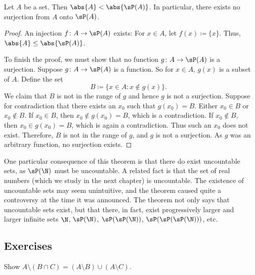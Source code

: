 \begin{thm}
\label{cantorspowersetthm}
Let $A$ be a set.  Then
$\abs{A} < \abs{\sP(A)}$.
In particular, there exists no surjection from
$A$ onto $\sP(A)$.
\end{thm}

\begin{proof}
An injection $f \colon A \to \sP(A)$ exists:
For $x \in A$, let $f(x) \coloneqq \{ x \}$.  Thus,
$\abs{A} \leq \abs{\sP(A)}$.

To finish the proof, we must show that
no function $g \colon A \to \sP(A)$ is a surjection.
Suppose 
$g \colon A \to \sP(A)$ is a function.  So for $x \in A$,
$g(x)$ is a subset of $A$.  Define the set
\begin{equation*}
B \coloneqq \bigl\{ x \in A : x \notin g(x) \bigr\} .
\end{equation*}
We claim that $B$ is not in the range of $g$ and hence $g$ is not a
surjection.  Suppose for contradiction that there exists an $x_0$ such that $g(x_0) = B$.
Either $x_0 \in B$ or $x_0 \notin B$.  If $x_0 \in B$, then $x_0 \notin
g(x_0) = B$, which is a contradiction.  If $x_0 \notin B$, then $x_0 \in
g(x_0) = B$, which is again a contradiction.  Thus such an $x_0$ does not
exist.  Therefore, $B$ is not in the range of $g$, and $g$ is not a
surjection.  As $g$ was an arbitrary function, no surjection exists.
\end{proof}

One particular consequence of this 
theorem is that there do exist uncountable sets,
as $\sP(\N)$ must be uncountable.
A related fact is that
the set of real numbers (which we study in the next chapter) is uncountable.
The existence of uncountable sets may seem unintuitive, and the theorem
caused quite a controversy at the time
it was announced.  The theorem not only says that uncountable sets exist,
but that there, in fact, exist progressively larger
and larger infinite sets $\N$, $\sP(\N)$,
$\sP(\sP(\N))$, $\sP(\sP(\sP(\N)))$, etc.

\subsection{Exercises}

\begin{exercise}
Show
$A \setminus (B \cap C) = (A \setminus B) \cup (A \setminus C)$.
\end{exercise}

